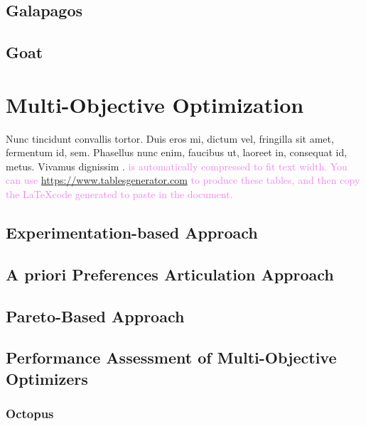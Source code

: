 \subsection{Galapagos}

\subsection{Goat}
\section{Multi-Objective Optimization}
Nunc tincidunt convallis tortor. Duis eros mi, dictum vel, fringilla sit amet, fermentum id, sem. Phasellus nunc enim, faucibus ut, laoreet in, consequat id, metus. Vivamus dignissim \cite{Moscoso:2011fk}. \textcolor{violet}{ is automatically compressed to fit text width. You can use \url{https://www.tablesgenerator.com} to produce these tables, and then copy the \LaTeX\space code generated to paste in the document.}

\subsection{Experimentation-based Approach}

\subsection{A priori Preferences Articulation Approach}

\subsection{Pareto-Based Approach}

\subsection{Performance Assessment of Multi-Objective Optimizers}

\subsubsection{Octopus}
